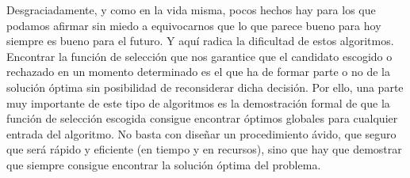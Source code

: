 Desgraciadamente, y como en la vida misma, pocos hechos hay para los que podamos afirmar sin miedo a equivocarnos que lo que parece bueno para hoy siempre es bueno para el futuro. Y aquí radica la dificultad de estos algoritmos. Encontrar la función de selección que nos garantice que el candidato escogido o rechazado en un momento determinado es el que ha de formar parte o no de la solución óptima sin posibilidad de reconsiderar dicha decisión. Por ello, una parte muy importante de este tipo de algoritmos es la demostración formal de que la función de selección escogida consigue encontrar óptimos globales para cualquier entrada del algoritmo. No basta con diseñar un procedimiento ávido, que seguro que será rápido y eficiente (en tiempo y en recursos), sino que hay que demostrar que siempre consigue encontrar la solución óptima del problema.